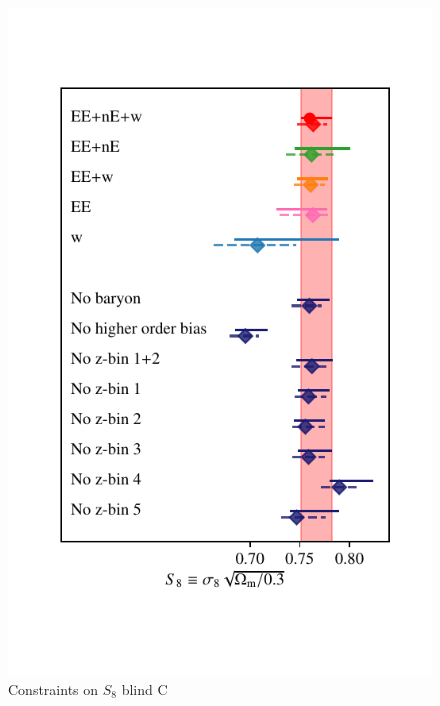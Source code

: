 \begin{figure}
	\begin{center}
		\includegraphics[width=\columnwidth]{Parameter_Plots/S8_comparison_blindC}
		\caption{Constraints on $S_{8}$ blind C}
		\label{fig:S8comp}
	\end{center}
\end{figure}


